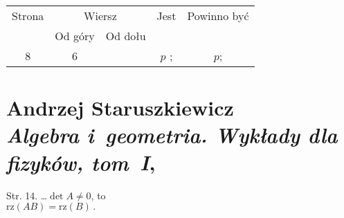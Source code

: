 \documentclass[a4paper,11pt]{article}
\numberwithin{equation}{section}
\begin{document}
\begin{center}

  \begin{tabular}{|c|c|c|c|c|}
    \hline
    Strona & \multicolumn{2}{c|}{Wiersz} & Jest
                              & Powinno być \\ \cline{2-3}
    & Od góry & Od dołu & & \\
    \hline
    8   & 6 & & $p$ ; & $p$; \\
    \hline
  \end{tabular}

\end{center}

\VerSpaceSix














\newpage

\section{ %
  Andrzej Staruszkiewicz \\
  \textit{Algebra i~geometria. Wykłady dla fizyków, tom~I}, \cite{ASAG}}

\vspace{0em}



\vspace{0em}


Str. 14. \ldots $\det A \neq 0$, to \\
$\textrm{rz} ( AB ) = \textrm{rz} ( B ) \, .$ \\













\printbibliography





\end{document}
